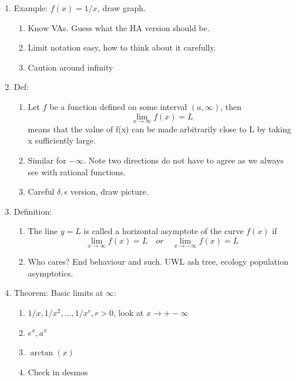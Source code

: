 \documentclass{article}
\begin{document}
\begin{enumerate}
\item Example: $f(x) = 1/x$, draw graph.
\begin{enumerate}
\item Know VAs. Guess what the HA version should be. 
\item Limit notation easy, how to think about it carefully.
\item Caution around infinity
\end{enumerate} 

\item Def: 
\begin{enumerate}
\item Let $f$ be a function defined on some interval $(a,\infty)$, then 
$$
\lim_{x\rightarrow \infty} f(x) = L
$$
means that the value of f(x) can be made arbitrarily close to L by taking x sufficiently large. 
\item Similar for $-\infty$.  Note two directions do not have to agree as we always see with rational functions.
\item Careful $\delta, \epsilon$ version, draw picture.
\end{enumerate}

\item Definition: 
\begin{enumerate}
\item The line $y=L$ is called a horizontal asymptote of the curve $f(x)$ if 
$$
\lim_{x\rightarrow \infty}f(x)=L \quad or \quad \lim_{x\rightarrow -\infty}f(x)=L
$$
\item Who cares? End behaviour and such. UWL ash tree, ecology population asymptotics.
\end{enumerate}

\item Theorem: Basic limits at $\infty$:
\begin{enumerate}
\item $1/x, 1/x^2, ..., 1/x^r, r>0$, look at $x \rightarrow +- \infty$
\item $e^x, a^x$
\item $\arctan(x)$
\item Check in desmos
\end{enumerate}


\end{enumerate}
\end{document}
